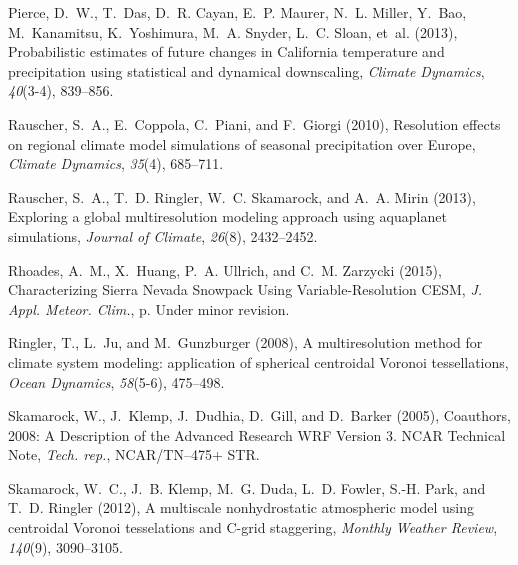 \documentclass[draft,ms]{agutex}   %
\begin{document}
\begin{article}
\begin{thebibliography}{72}
Pierce, D.~W., T.~Das, D.~R. Cayan, E.~P. Maurer, N.~L. Miller, Y.~Bao,
  M.~Kanamitsu, K.~Yoshimura, M.~A. Snyder, L.~C. Sloan, et~al. (2013),
  {Probabilistic estimates of future changes in California temperature and
  precipitation using statistical and dynamical downscaling}, \textit{Climate
  Dynamics}, \textit{40}(3-4), 839--856.

Rauscher, S.~A., E.~Coppola, C.~Piani, and F.~Giorgi (2010), {Resolution
  effects on regional climate model simulations of seasonal precipitation over
  Europe}, \textit{Climate Dynamics}, \textit{35}(4), 685--711.

Rauscher, S.~A., T.~D. Ringler, W.~C. Skamarock, and A.~A. Mirin (2013),
  {Exploring a global multiresolution modeling approach using aquaplanet
  simulations}, \textit{Journal of Climate}, \textit{26}(8), 2432--2452.

Rhoades, A.~M., X.~Huang, P.~A. Ullrich, and C.~M. Zarzycki (2015),
  {Characterizing Sierra Nevada Snowpack Using Variable-Resolution CESM},
  \textit{J. Appl. Meteor. Clim.}, p. Under minor revision.

Ringler, T., L.~Ju, and M.~Gunzburger (2008), {A multiresolution method for
  climate system modeling: application of spherical centroidal Voronoi
  tessellations}, \textit{Ocean Dynamics}, \textit{58}(5-6), 475--498.

Skamarock, W., J.~Klemp, J.~Dudhia, D.~Gill, and D.~Barker (2005), {Coauthors,
  2008: A Description of the Advanced Research WRF Version 3. NCAR Technical
  Note}, \textit{Tech. rep.}, NCAR/TN--475+ STR.

Skamarock, W.~C., J.~B. Klemp, M.~G. Duda, L.~D. Fowler, S.-H. Park, and T.~D.
  Ringler (2012), {A multiscale nonhydrostatic atmospheric model using
  centroidal Voronoi tesselations and C-grid staggering}, \textit{Monthly
  Weather Review}, \textit{140}(9), 3090--3105.


\end{thebibliography}
\end{article}
\end{document}
